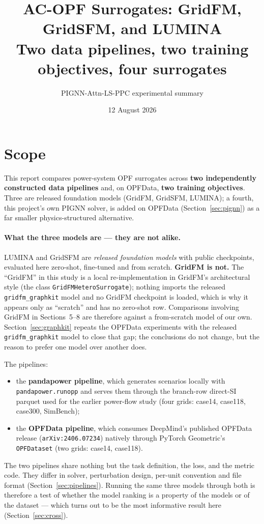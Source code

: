 \documentclass[10pt]{article}
\title{AC-OPF Surrogates: GridFM, GridSFM, and LUMINA\\
\large Two data pipelines, two training objectives, four surrogates}
\author{PIGNN-Attn-LS-PPC experimental summary}
\date{12 August 2026}
\begin{document}
\maketitle

\section{Scope}
This report compares power-system OPF surrogates across \textbf{two
independently constructed data pipelines} and, on OPFData, \textbf{two training
objectives}. Three are released foundation models (GridFM, GridSFM, LUMINA);
a fourth, this project's own PIGNN solver, is added on OPFData
(Section~\ref{sec:pignn}) as a far smaller physics-structured alternative.

\paragraph{What the three models are --- they are not alike.} LUMINA and GridSFM
are \emph{released foundation models} with public checkpoints, evaluated here
zero-shot, fine-tuned and from scratch. \textbf{GridFM is not.} The ``GridFM'' in
this study is a local re-implementation in GridFM's architectural style
(the class \texttt{GridFMHeteroSurrogate}); nothing imports the released
\texttt{gridfm\_graphkit} model and no GridFM checkpoint is loaded,
which is why it appears only as ``scratch'' and has no zero-shot row. Comparisons
involving GridFM in Sections~5--8 are therefore against a from-scratch model of
our own. Section~\ref{sec:graphkit} repeats the OPFData experiments with the
released \texttt{gridfm\_graphkit} model to close that gap; the conclusions do
not change, but the reason to prefer one model over another does.

The pipelines:

\begin{itemize}\itemsep2pt
\item the \textbf{pandapower pipeline}, which generates scenarios locally with
\texttt{pandapower.runopp} and serves them through the branch-row direct-SI
parquet used for the earlier power-flow study (four grids: case14, case118,
case300, SimBench);
\item the \textbf{OPFData pipeline}, which consumes DeepMind's published
OPFData release (\texttt{arXiv:2406.07234}) natively through PyTorch
Geometric's \texttt{OPFDataset} (two grids: case14, case118).
\end{itemize}

The two pipelines share nothing but the task definition, the loss, and the
metric code. They differ in solver, perturbation design, per-unit convention and
file format (Section~\ref{sec:pipelines}). Running the same three models through
both is therefore a test of whether the model ranking is a property of the
models or of the dataset --- which turns out to be the most informative result
here (Section~\ref{sec:cross}).
\end{document}
